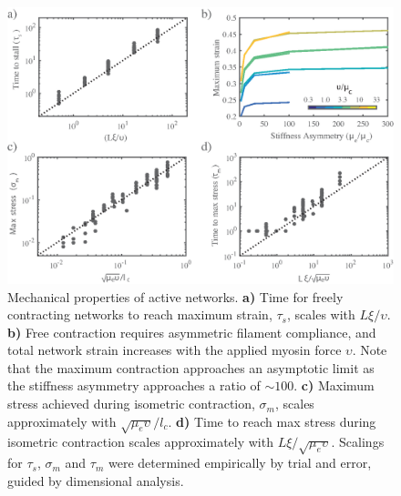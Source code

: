\documentclass[10pt,letterpaper]{article}
\begin{document}
\begin{figure}[h!]
\centering
\includegraphics[width=\hsize]{figures/figureS4}
\caption{\label{fig:active_supp}  Mechanical properties of active networks.  \textbf{a)}  Time for freely contracting networks to reach maximum strain, $\tau_s$, scales with $L\xi/\upsilon$.  \textbf{b)} Free contraction requires asymmetric filament compliance, and total network strain increases with the applied myosin force $\upsilon$. Note that the maximum contraction approaches an asymptotic limit as the stiffness asymmetry approaches a ratio of $\sim 100$.   \textbf{c)}  Maximum stress achieved during isometric contraction, $\sigma_m$, scales approximately with $\sqrt{\mu_e\upsilon}/l_c$.  \textbf{d)} Time to reach max stress during isometric contraction scales approximately with $L\xi/\sqrt{\mu_e\upsilon}$. Scalings for $\tau_s$, $\sigma_m$ and $\tau_m$ were determined empirically by trial and error, guided by dimensional analysis. }
\end{figure}
\end{document}
